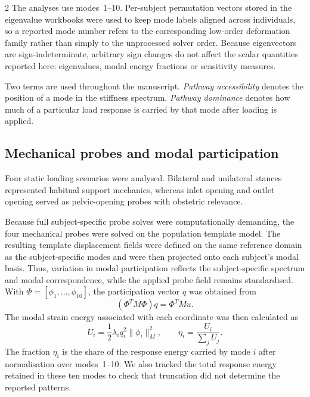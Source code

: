 \documentclass[openacc]{rsproca_new}
\begin{document}
\begin{multicols}{2}
The analyses use modes~1--10. Per-subject permutation vectors stored in the eigenvalue workbooks were used to keep mode labels aligned across individuals, so a reported mode number refers to the corresponding low-order deformation family rather than simply to the unprocessed solver order. Because eigenvectors are sign-indeterminate, arbitrary sign changes do not affect the scalar quantities reported here: eigenvalues, modal energy fractions or sensitivity measures.

Two terms are used throughout the manuscript. \emph{Pathway accessibility} denotes the position of a mode in the stiffness spectrum. \emph{Pathway dominance} denotes how much of a particular load response is carried by that mode after loading is applied.


\subsection{Mechanical probes and modal participation}

Four static loading scenarios were analysed. Bilateral and unilateral stances represented habitual support mechanics, whereas inlet opening and outlet opening served as pelvic-opening probes with obstetric relevance.

Because full subject-specific probe solves were computationally demanding, the four mechanical probes were solved on the population template model. The resulting template displacement fields were defined on the same reference domain as the subject-specific modes and were then projected onto each subject's modal basis. Thus, variation in modal participation reflects the subject-specific spectrum and modal correspondence, while the applied probe field remains standardised. With $\Phi=[\phi_{1},\ldots,\phi_{10}]$, the participation vector $q$ was obtained from
\begin{equation}
(\Phi^{T}M\Phi)q = \Phi^{T}Mu.
\end{equation}
The modal strain energy associated with each coordinate was then calculated as
\begin{equation}
U_{i}=\frac{1}{2}\lambda_{i}q_{i}^{2}\lVert\phi_{i}\rVert_{M}^{2}, \qquad
\eta_{i}=\frac{U_{i}}{\sum_{j}U_{j}}.
\end{equation}
The fraction $\eta_i$ is the share of the response energy carried by mode $i$ after normalisation over modes~1--10. We also tracked the total response energy retained in these ten modes to check that truncation did not determine the reported patterns.


\end{multicols}
\end{document}
